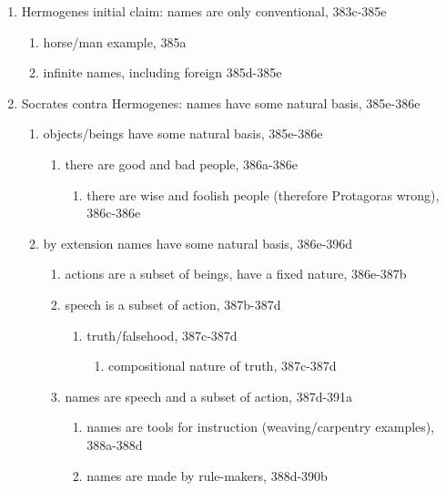 \documentclass[12pt]{article}
\begin{document}
\begin{small}
\begin{enumerate}
\item Hermogenes initial claim: names are only conventional, 383c-385e
    \begin{enumerate}
    \item horse/man example, 385a
    \item infinite names, including foreign 385d-385e
    \end{enumerate}
\item Socrates contra Hermogenes: names have some natural basis, 385e-386e
    \begin{enumerate}
    \item objects/beings have some natural basis, 385e-386e
        \begin{enumerate}
        \item there are good and bad people, 386a-386e
            \begin{enumerate}
            \item there are wise and foolish people (therefore Protagoras wrong), 386c-386e
            \end{enumerate}
        \end{enumerate}
    \item by extension names have some natural basis, 386e-396d
        \begin{enumerate}
        \item actions are a subset of beings, have a fixed nature, 386e-387b
        \item speech is a  subset of action, 387b-387d
            \begin{enumerate}
            \item truth/falsehood, 387c-387d
                \begin{enumerate}
                \item compositional nature of truth, 387c-387d
                \end{enumerate}
            \end{enumerate}
        \item names are speech and a subset of action, 387d-391a
            \begin{enumerate}
            \item names are tools for instruction (weaving/carpentry examples), 388a-388d
            \item names are made by rule-makers, 388d-390b
                \begin{enumerate}

\end{enumerate}
\end{enumerate}
\end{enumerate}
\end{enumerate}
\end{enumerate}
\end{small}
\end{document}
